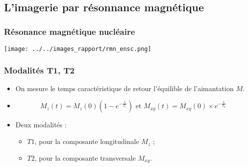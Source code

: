 \subsection{L'imagerie par r\'esonnance magn\'etique}



\begin{frame}
\frametitle{R\'esonance magn\'etique nucl\'eaire}
\texttt{[image: ../../images\_rapport/rmn\_ensc.png]}
\end{frame}

\begin{frame}
\frametitle{Modalit\'es T1, T2}
\begin{itemize}
\item<+-> On mesure le temps caract\'eristique de retour  l'\'equilible de l'aimantation $M$.
\item<+-> \[M_z(t)=M_z(0)\left(1-e^{-\frac{t}{T_1}}\right)\text{ et }M_{xy}(t)=M_{xy}(0)\times e^{-\frac{t}{T_2}}\]
\item<+-> Deux modalit\'es :
\begin{itemize}
\item<+-> $T1$, pour la composante longitudinale $M_z$ ;
\item<+-> $T2$, pour la composante transversale $M_{xy}$.
\end{itemize}
\end{itemize}
\end{frame}

